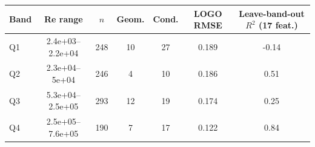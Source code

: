 \begin{tabular}{lcccccc}\toprule Band & Re range & $n$ & Geom. & Cond. & LOGO RMSE & Leave-band-out $R^2$ (17 feat.)\\\midrule
Q1 & 2.4e+03--2.2e+04 & 248 & 10 & 27 & 0.189 & -0.14\\
Q2 & 2.3e+04--5e+04 & 246 & 4 & 10 & 0.186 & 0.51\\
Q3 & 5.3e+04--2.5e+05 & 293 & 12 & 19 & 0.174 & 0.25\\
Q4 & 2.5e+05--7.6e+05 & 190 & 7 & 17 & 0.122 & 0.84\\
\bottomrule\end{tabular}